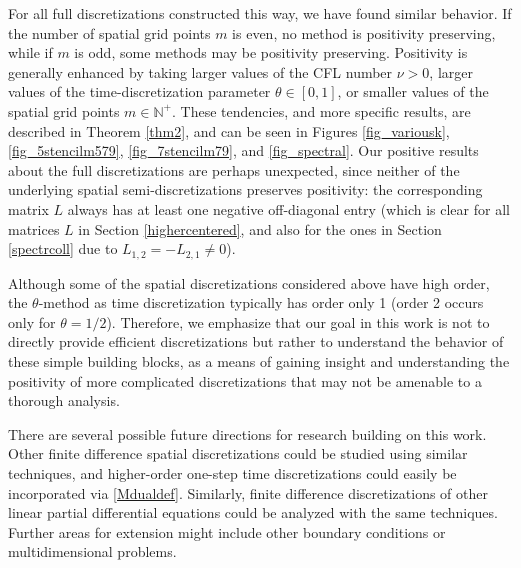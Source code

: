 \documentclass[a4paper]{article}
\begin{document}
For all full discretizations constructed this way, we have found similar behavior.
If the number of spatial grid points $m$ is even, no method is positivity
preserving, while if $m$ is odd, some methods may be positivity
preserving.  Positivity is generally enhanced by taking larger values
of the CFL number $\nu>0$, larger values of the time-discretization parameter $\theta\in [0,1]$, or smaller
values of the spatial grid points $m\in\mathbb{N}^+$.  These tendencies, and more specific results, are described
in Theorem \ref{thm2}, and can be seen
in Figures \ref{fig_variousk}, \ref{fig_5stencilm579}, \ref{fig_7stencilm79},
and \ref{fig_spectral}.
Our positive results about the full discretizations are perhaps unexpected, since neither of the underlying spatial semi-discretizations preserves positivity: the corresponding matrix $L$ always has at least one negative off-diagonal entry (which is clear for all matrices $L$ in Section \ref{highercentered}, and also for the ones in Section \ref{spectrcoll} due to $L_{1,2}=-L_{2,1}\ne 0$).

Although some of the spatial discretizations considered above have high order, the $\theta$-method as time discretization typically has order only 1 (order 2 occurs only for $\theta=1/2$). Therefore, we emphasize that our goal in this work is not to directly provide efficient discretizations but rather
to understand the behavior of these simple building blocks, as a means
of gaining insight and understanding the positivity of more complicated
discretizations that may not be amenable to a thorough analysis.


There are several possible future directions for research building on this
work.  Other finite difference spatial discretizations could be studied
using similar techniques, and higher-order one-step time discretizations could
easily be incorporated via \eqref{Mdualdef}.  Similarly, finite difference
discretizations of other linear partial differential equations could be analyzed with the same techniques.
Further areas for extension might 
include other boundary conditions or
multidimensional problems.



\end{document}
